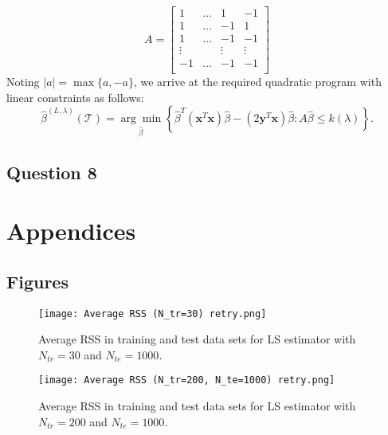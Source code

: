 \documentclass{article}
\begin{document}
\begin{equation*}
A=
\begin{bmatrix}
1 & \dots & 1 & -1 \\
1 & \dots & -1 & 1 \\
1 & \dots & -1 & -1 \\
\vdots & & \vdots & \vdots \\
-1 & \dots & -1 & -1 \\
\end{bmatrix}
\end{equation*}
Noting $|a| =\max\{a,-a\}$, we arrive at the required quadratic program with linear constraints as follows:
\begin{equation*}
\hat{\beta}^{(L,\lambda)}(\mathcal{T}) = \underset{\hat{\beta}}{\arg\min} \left \{ \hat{\beta}^T(\textbf{x}^T\textbf{x})\hat{\beta}-(2\textbf{y}^T\textbf{x})\hat{\beta} : A\hat{\beta} \leq k(\lambda) \right \}.
\end{equation*}

\subsection{Question 8}






\newpage

\section{Appendices}

\subsection{Figures}

\begin{figure}[h!]
\begin{center}
\texttt{[image: Average RSS (N\_tr=30) retry.png]}
\caption{Average RSS in training and test data sets for LS estimator with $N_{tr}=30$ and $N_{te}=1000$.}
\label{fig:Q2 N30}
\end{center}
\end{figure}

\begin{figure}
\begin{center}
\texttt{[image: Average RSS (N\_tr=200, N\_te=1000) retry.png]}
\caption{Average RSS in training and test data sets for LS estimator with $N_{tr}=200$ and $N_{te}=1000$.}
\label{fig:Q2 N200}
\end{center}
\end{figure}
\end{document}
